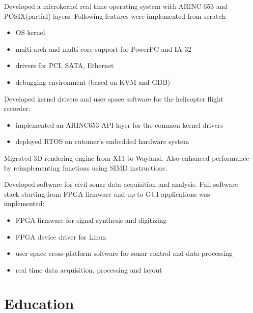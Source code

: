 \documentclass[11pt, a4paper]{moderncv}
\begin{document}
{
  Developed a microkernel real time operating system with ARINC 653 and POSIX(partial) layers.
  Following features were implemented from scratch:
    \begin{itemize}
      \item OS kernel
      \item multi-arch and multi-core support for PowerPC and IA-32
      \item drivers for PCI, SATA, Ethernet
      \item debugging environment (based on KVM and GDB)
    \end{itemize}
  Developed kernel drivers and user space software for the helicopter flight recorder:
    \begin{itemize}
      \item implemented an ARINC653 API layer for the common kernel drivers
      \item deployed RTOS on cutomer's embedded hardware system
    \end{itemize}
}

{
  Migrated 3D rendering engine from X11 to Wayland.
  Also enhanced performance by reimplementing functions using SIMD instructions.
}

{
  Developed software for civil sonar data acquisition and analysis.
  Full software stack starting from FPGA firmware and up to GUI applications was implemented:
  \begin{itemize}
    \item FPGA firmware for signal synthesis and digitizing
    \item FPGA device driver for Linux
    \item user space cross-platform software for sonar control and data processing
    \item real time data acquisition, processing and layout
  \end{itemize}
}



\section{Education}

\end{document}
